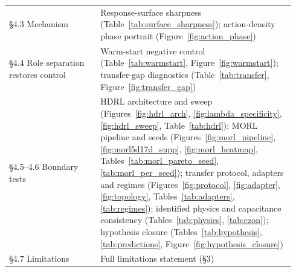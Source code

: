 \documentclass[11pt,a4paper]{article}
\begin{document}
\begin{longtable}{@{}p{0.30\linewidth}p{0.64\linewidth}@{}}
\S4.3 Mechanism & Response-surface sharpness (Table~\ref{tab:surface_sharpness}); action-density phase portrait (Figure~\ref{fig:action_phase}) \\
\S4.4 Role separation restores control & Warm-start negative control (Table~\ref{tab:warmstart}, Figure~\ref{fig:warmstart}); transfer-gap diagnostics (Table~\ref{tab:transfer}, Figure~\ref{fig:transfer_gap}) \\
\S4.5--4.6 Boundary tests & HDRL architecture and sweep (Figures~\ref{fig:hdrl_arch}, \ref{fig:lambda_specificity}, \ref{fig:hdrl_sweep}, Table~\ref{tab:hdrl}); MORL pipeline and seeds (Figures~\ref{fig:morl_pipeline}, \ref{fig:morl5d17d_supp}, \ref{fig:morl_heatmap}, Tables~\ref{tab:morl_pareto_seed}, \ref{tab:morl_per_seed}); transfer protocol, adapters and regimes (Figures~\ref{fig:protocol}, \ref{fig:adapter}, \ref{fig:topology}, Tables~\ref{tab:adapters}, \ref{tab:regimes}); identified physics and capacitance consistency (Tables~\ref{tab:physics}, \ref{tab:czon}); hypothesis closure (Tables~\ref{tab:hypothesis}, \ref{tab:predictions}, Figure~\ref{fig:hypothesis_closure}) \\
\S4.7 Limitations & Full limitations statement (\S3) \\
\bottomrule
\end{longtable}
\end{document}
